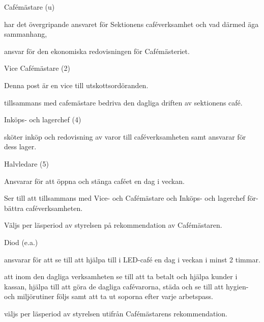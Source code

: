\documentclass[10pt]{article}
\begin{document}
\begin{emptylist}
    \item Cafémästare (u)
        \begin{dashlist}
            \item har det övergripande ansvaret för Sektionens
                caféverksamhet och vad därmed äga sammanhang,
            \item ansvar för den ekonomiska redovisningen för
                Cafémästeriet.
        \end{dashlist}
    \item Vice Cafémästare (2)
        \begin{dashlist}
            \item Denna post är en vice till utskottsordöranden.
            \item tillsammans med cafemästare bedriva den dagliga driften
                av sektionens café.
        \end{dashlist}
    \item Inköps- och lagerchef (4)
        \begin{dashlist}
            \item sköter inköp och redovisning av varor till caféverksamheten samt ansvarar för dess lager.
        \end{dashlist}
    \item Halvledare (5)
    \begin{tightdashlist}
        \item Ansvarar för att öppna och stänga caféet en dag i veckan.
        \item Ser till att tillsammans med Vice- och Cafémästare och Inköps- och lagerchef för-bättra caféverksamheten.
        \item Väljs per läsperiod av styrelsen på rekommendation av Cafémästaren.
    \end{tightdashlist}
    \item Diod (e.a.)
    		\begin{dashlist}
            \item ansvarar för att se till att hjälpa till i LED-café en dag i veckan i minst 2 timmar.
            \item att inom den dagliga verksamheten se till att ta betalt och hjälpa kunder i kassan, hjälpa till att göra de dagliga cafévarorna, städa och se till att hygien- och miljörutiner följs samt att ta ut soporna efter varje arbetspass.
            \item väljs per läsperiod av styrelsen utifrån Cafémästarens rekommendation.
        \end{dashlist}
\end{emptylist}
\end{document}
